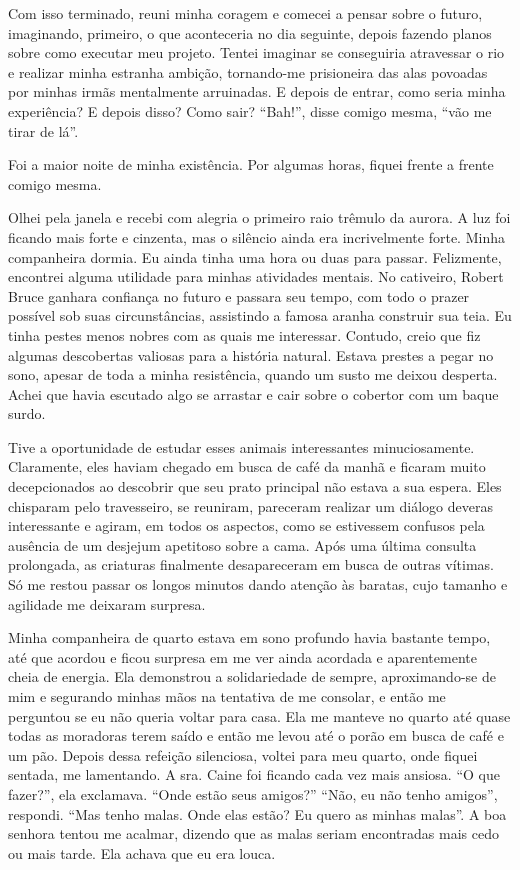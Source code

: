 Com isso terminado, reuni minha coragem e comecei a pensar sobre o
futuro, imaginando, primeiro, o que aconteceria no dia seguinte, depois
fazendo planos sobre como executar meu projeto. Tentei imaginar se
conseguiria atravessar o rio e realizar minha estranha ambição,
tornando-me prisioneira das alas povoadas por minhas irmãs mentalmente
arruinadas. E depois de entrar, como seria minha experiência? E depois
disso? Como sair? ``Bah!'', disse comigo mesma, ``vão me tirar de
lá''.

Foi a maior noite de minha existência. Por algumas horas, fiquei frente
a frente comigo mesma.

Olhei pela janela e recebi com alegria o primeiro raio trêmulo da
aurora. A luz foi ficando mais forte e cinzenta, mas o silêncio ainda
era incrivelmente forte. Minha companheira dormia. Eu ainda tinha uma
hora ou duas para passar. Felizmente, encontrei alguma utilidade para
minhas atividades mentais. No cativeiro, Robert Bruce ganhara confiança
no futuro e passara seu tempo, com todo o prazer possível sob suas
circunstâncias, assistindo a famosa aranha construir sua teia. Eu tinha
pestes menos nobres com as quais me interessar. Contudo, creio que fiz
algumas descobertas valiosas para a história natural. Estava prestes a
pegar no sono, apesar de toda a minha resistência, quando um susto me
deixou desperta. Achei que havia escutado algo se arrastar e cair sobre
o cobertor com um baque surdo.

Tive a oportunidade de estudar esses animais interessantes
minuciosamente. Claramente, eles haviam chegado em busca de café da
manhã e ficaram muito decepcionados ao descobrir que seu prato principal
não estava a sua espera. Eles chisparam pelo travesseiro, se reuniram,
pareceram realizar um diálogo deveras interessante e agiram, em todos os
aspectos, como se estivessem confusos pela ausência de um desjejum
apetitoso sobre a cama. Após uma última consulta prolongada, as
criaturas finalmente desapareceram em busca de outras vítimas. Só me
restou passar os longos minutos dando atenção às baratas, cujo tamanho e
agilidade me deixaram surpresa.

Minha companheira de quarto estava em sono profundo havia bastante
tempo, até que acordou e ficou surpresa em me ver ainda acordada e
aparentemente cheia de energia. Ela demonstrou a solidariedade de
sempre, aproximando-se de mim e segurando minhas mãos na tentativa de me
consolar, e então me perguntou se eu não queria voltar para casa. Ela me
manteve no quarto até quase todas as moradoras terem saído e então me
levou até o porão em busca de café e um pão. Depois dessa refeição
silenciosa, voltei para meu quarto, onde fiquei sentada, me lamentando.
A sra. Caine foi ficando cada vez mais ansiosa. ``O que fazer?'',
ela exclamava. ``Onde estão seus amigos?'' ``Não, eu não tenho amigos'',
respondi. ``Mas tenho malas. Onde elas estão? Eu quero as minhas
malas''. A boa senhora tentou me acalmar, dizendo que as malas seriam
encontradas mais cedo ou mais tarde. Ela achava que eu era louca.


